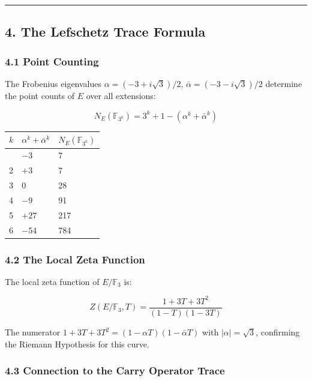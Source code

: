 \documentclass[
  11pt,
]{article}
\begin{document}
\begin{center}\rule{0.5\linewidth}{0.5pt}\end{center}

\newpage

\subsection{4. The Lefschetz Trace Formula}\label{the-lefschetz-trace-formula}

\subsubsection{4.1 Point Counting}\label{point-counting}

The Frobenius eigenvalues \(\alpha = (-3 + i\sqrt{3})/2\),
\(\bar{\alpha} = (-3 - i\sqrt{3})/2\) determine the point counts of \(E\) over
all extensions:

\[N_E(\mathbb{F}_{3^k}) = 3^k + 1 - (\alpha^k + \bar{\alpha}^k)\]

\begin{longtable}[]{@{}lll@{}}
\toprule\noalign{}
\(k\) & \(\alpha^k + \bar{\alpha}^k\) & \(N_E(\mathbb{F}_{3^k})\) \\
\midrule\noalign{}
\endhead
\bottomrule\noalign{}
\endlastfoot
1 & \(-3\) & 7 \\
2 & \(+3\) & 7 \\
3 & \(0\) & 28 \\
4 & \(-9\) & 91 \\
5 & \(+27\) & 217 \\
6 & \(-54\) & 784 \\
\end{longtable}

\subsubsection{4.2 The Local Zeta Function}\label{the-local-zeta-function}

The local zeta function of \(E/\mathbb{F}_3\) is:

\[Z(E/\mathbb{F}_3, T) = \frac{1 + 3T + 3T^2}{(1 - T)(1 - 3T)}\]

The numerator \(1 + 3T + 3T^2 = (1 - \alpha T)(1 - \bar{\alpha} T)\) with
\(\lvert\alpha\rvert = \sqrt{3}\), confirming the Riemann Hypothesis for this
curve.

\subsubsection{4.3 Connection to the Carry Operator
Trace}\label{connection-to-the-carry-operator-trace}
\end{document}
